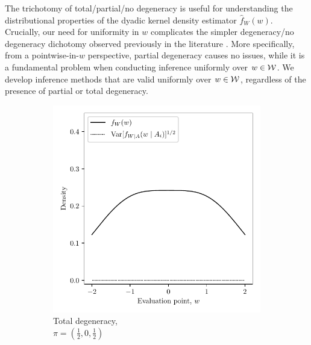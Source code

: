 The trichotomy of total/partial/no  degeneracy is useful for understanding the
distributional properties of the dyadic kernel density estimator
$\hat{f}_W(w)$. Crucially, our need for uniformity in $w$ complicates the
simpler degeneracy/no degeneracy dichotomy observed previously in the literature
\citep{graham2022kernel}.
More specifically,
from a pointwise-in-$w$ perspective,
partial degeneracy causes no issues,
while it is a fundamental problem
when conducting inference uniformly over $w \in \mathcal{W}$.
We develop inference methods
that are valid uniformly over $w \in \mathcal{W}$,
regardless of the presence of partial or total degeneracy.

\begin{figure}[ht]
  \captionsetup[subfigure]{justification=centering}
  \centering
  \begin{subfigure}{0.32\textwidth}
    \centering
    \includegraphics[scale=0.48]{graphics/illustration_total.pdf}
    \caption{
      Total degeneracy, \\
      $\pi = \left( \frac{1}{2}, 0, \frac{1}{2} \right)$
    }
  \end{subfigure}
  \begin{subfigure}{0.32\textwidth}
    \centering

\end{subfigure}
\end{figure}
